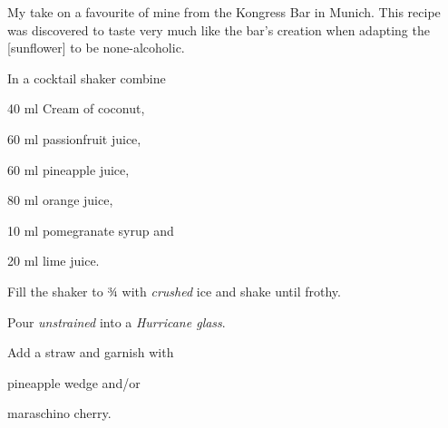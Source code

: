 \startsection[title={Cujamara},reference=cujamara]
My take on a favourite of mine from the Kongress Bar in Munich. This
recipe was discovered to taste very much like the bar's creation when
adapting the [sunflower] to be none-alcoholic.

\startitemize
\item In a cocktail shaker combine
      \startitemize
      \item 40 ml Cream of coconut,
      \item 60 ml passionfruit juice,
      \item 60 ml pineapple juice,
      \item 80 ml orange juice,
      \item 10 ml pomegranate syrup and
      \item 20 ml lime juice.
      \stopitemize
\item Fill the shaker to ¾ with {\em crushed} ice and shake until frothy.
\item Pour {\em unstrained} into a {\em Hurricane glass}.
\item Add a straw and garnish with
      \startitemize
      \item pineapple wedge and/or
      \item maraschino cherry.
      \stopitemize
\stopitemize
\stopsection

